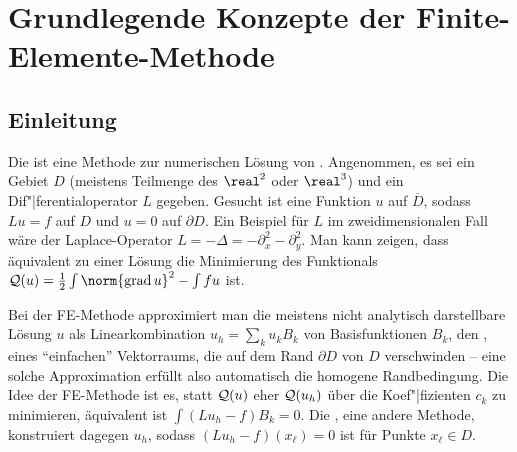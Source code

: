 \chapter{%
    Grundlegende Konzepte der Finite-Elemente-Methode%
}

\section{%
    Einleitung%
}

Die 
ist eine Methode zur numerischen Lösung von .
Angenommen, es sei ein Gebiet $D$ (meistens Teilmenge des $\real^2$ oder $\real^3$) und ein
Dif"|ferentialoperator $L$ gegeben.
Gesucht ist eine Funktion $u$ auf $\overline{D}$, sodass $Lu = f$ auf $D$ und $u = 0$ auf
$\partial D$.
Ein Beispiel für $L$ im zweidimensionalen Fall wäre der Laplace-Operator
$L = -\Delta = -\partial_x^2 - \partial_y^2$.
Man kann zeigen, dass äquivalent zu einer Lösung die Minimierung des Funktionals
$\Q(u) = \frac{1}{2} \int \norm{\grad u}^2 - \int fu$ ist.

Bei der FE-Methode approximiert man die meistens nicht analytisch darstellbare Lösung $u$
als Linearkombination $u_h = \sum_k u_k B_k$ von Basisfunktionen
$B_k$, den , eines "`einfachen"' Vektorraums,
die auf dem Rand $\partial D$ von $D$ verschwinden --
eine solche Approximation erfüllt also automatisch die homogene Randbedingung.
Die Idee der FE-Methode ist es, statt $\mathcal{Q}(u)$ eher $\mathcal{Q}(u_h)$ über die Koef"|fizienten $c_k$
zu minimieren, äquivalent ist $\int (Lu_h - f) B_k = 0$.
Die , eine andere Methode, konstruiert dagegen $u_h$, sodass
$(Lu_h - f)(x_\ell) = 0$ ist für Punkte $x_\ell \in D$.

